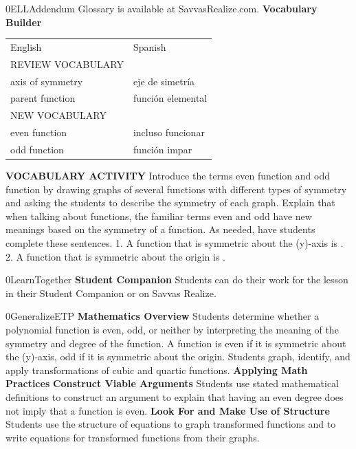 \documentclass{article}
\newenvironment{te-addendum}[2]{}{}     %
\newcommand{\answer}[1]{}               %
\newcommand{\placeholder}[2]{}          %
\newcommand{\te}[1]{}                   %
\begin{document}
\begin{te-addendum}{0}{ELLAddendum}
Glossary is available at SavvasRealize.com.
\textbf{Vocabulary Builder}
\begin{tabular}{ll}
English & Spanish \\
REVIEW VOCABULARY & \\
axis of symmetry & eje de simetría \\
parent function & función elemental \\
NEW VOCABULARY & \\
even function & incluso funcionar \\
odd function & función impar \\
\end{tabular}
\te{Printed Spanish incluso funcionar; likely función par.}
\textbf{VOCABULARY ACTIVITY}
Introduce the terms even function and odd function by drawing graphs of several functions with different types of symmetry and asking the students to describe the symmetry of each graph. Explain that when talking about functions, the familiar terms even and odd have new meanings based on the symmetry of a function. As needed, have students complete these sentences.
1. A function that is symmetric about the (y)-axis is \underline{\hspace{1cm}}. \answer{even}
2. A function that is symmetric about the origin is \underline{\hspace{1cm}}. \answer{odd}
\end{te-addendum}
\begin{te-addendum}{0}{LearnTogether}
\textbf{Student Companion}
Students can do their work for the lesson in their Student Companion or on Savvas Realize.
\placeholder{illustration}{Student Companion cover, enVision Algebra 2, SAVVAS; luminous purple and blue circular design.}
\end{te-addendum}
\begin{te-addendum}{0}{GeneralizeETP}
\textbf{Mathematics Overview}
Students determine whether a polynomial function is even, odd, or neither by interpreting the meaning of the symmetry and degree of the function. A function is even if it is symmetric about the (y)-axis, odd if it is symmetric about the origin.
Students graph, identify, and apply transformations of cubic and quartic functions.
\textbf{Applying Math Practices}
\textbf{Construct Viable Arguments}
Students use stated mathematical definitions to construct an argument to explain that having an even degree does not imply that a function is even.
\textbf{Look For and Make Use of Structure}
Students use the structure of equations to graph transformed functions and to write equations for transformed functions from their graphs.
\end{te-addendum}
\end{document}

